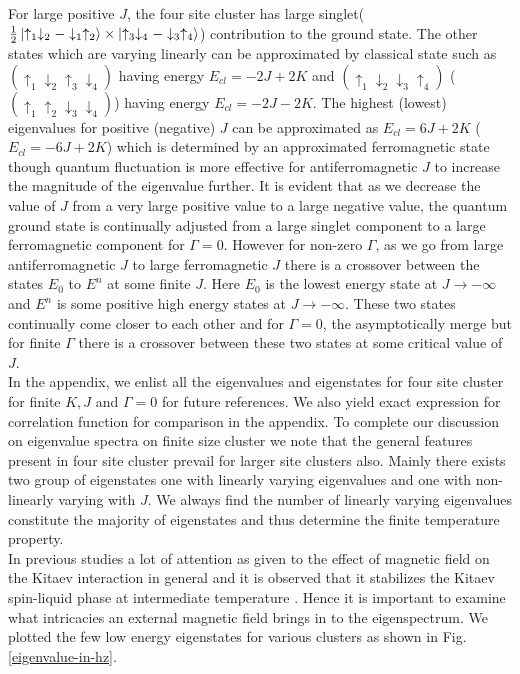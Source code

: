 \documentclass[aps,amsmath,twocolumn,amssymb,floatfix,showpacs,superscriptaddress,nofootinbib,longbibliography]{revtex4-1}
\begin{document}
For large positive $J$, the four site cluster has large singlet($\frac{1}{2}\ket{\uparrow_1\downarrow_2-\downarrow_1\uparrow_2}\times\ket{\uparrow_3\downarrow_4-\downarrow_3\uparrow_4}$) contribution to the ground state. The other states which are varying linearly can be approximated by classical state such as $\left( \uparrow_1\downarrow_2\uparrow_3\downarrow_4\right) $ having energy $E_{cl}=-2J+2K$ and $\left( \uparrow_1\downarrow_2\downarrow_3\uparrow_4\right) $ ($\left( \uparrow_1\uparrow_2\downarrow_3\downarrow_4\right)  $) having energy $E_{cl}=-2J-2K$. The highest (lowest) eigenvalues for positive (negative) $J$ can be approximated as $E_{cl}=6J+2K$ ($E_{cl}=-6J+2K$) which is determined  by an approximated ferromagnetic state though quantum fluctuation is more effective for antiferromagnetic $J$ to increase the magnitude of the eigenvalue  further. It is evident that as we decrease the value of $J$ from a very large positive value to a large negative value, the quantum ground state  is continually adjusted from a large singlet component to a large ferromagnetic component for $\Gamma=0$. However for non-zero $\Gamma$, as we go from large antiferromagnetic $J$ to large ferromagnetic $J$ there is a crossover between the states $E_{0}$ to $E^n$ at some finite $J$. Here $E_0$ is the lowest energy state at $J \rightarrow - \infty$ and $E^{n}$ is some positive high energy states at $J \rightarrow - \infty$. These two states continually come closer to each  other and for $\Gamma=0$, the asymptotically merge but for finite $\Gamma$ there is a crossover between these two states at some critical value of $J$.   \\
\indent
In the appendix, we enlist all the eigenvalues and eigenstates for four site cluster for finite $K, J$ and $\Gamma=0$ for future references. We also yield exact expression for correlation function for comparison in the appendix. To complete our discussion on eigenvalue spectra on finite size cluster  we note that the general features present in four site cluster prevail for larger site clusters also. Mainly there exists two group of eigenstates one with linearly varying eigenvalues and one
with non-linearly varying with $J$. We always find the number of linearly varying eigenvalues constitute the majority of eigenstates and thus determine the finite temperature property. \\
In previous studies a lot of attention as given to the effect of magnetic field on the Kitaev interaction in general and it is observed that it stabilizes the Kitaev spin-liquid phase at intermediate temperature \cite{berke-prb-2020,nasu-motome-2015,koga-nasu-2019,li-2021-ncom}. Hence it is important to  examine what intricacies an external magnetic field brings in to the eigenspectrum. We plotted the few low energy eigenstates for various clusters as shown in Fig. \ref{eigenvalue-in-hz}. \\
\end{document}
